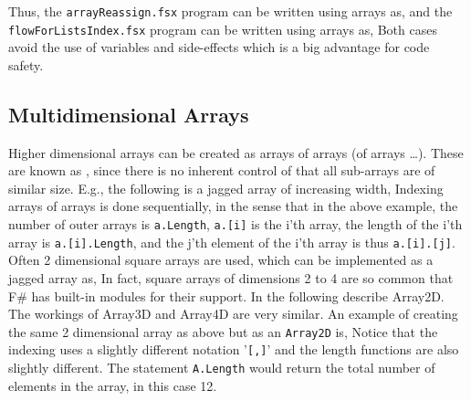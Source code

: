 Thus, the \texttt{arrayReassign.fsx} program can be written using arrays as,
and the \texttt{flowForListsIndex.fsx} program can be written using arrays as,
Both cases avoid the use of variables and side-effects which is a big advantage for code safety.

\subsection{Multidimensional Arrays}
Higher dimensional arrays can be created as arrays of arrays (of arrays \dots). These are known as , since there is no inherent control of that all sub-arrays are of similar size. E.g., the following is a jagged array of increasing width,
Indexing arrays of arrays is done sequentially, in the sense that in the above example, the number of outer arrays is \verb|a.Length|,  \verb|a.[i]| is the i'th array, the length of the i'th array is \verb|a.[i].Length|, and the j'th element of the i'th array is thus \verb|a.[i].[j]|. Often 2 dimensional square arrays are used, which can be implemented as a jagged array as,
In fact, square arrays of dimensions 2 to 4 are so common that F\# has built-in modules for their support. In the following describe Array2D. The workings of Array3D and Array4D are very similar. An example of creating the same 2 dimensional array as above but as an \texttt{Array2D} is,
Notice that the indexing uses a slightly different notation '\verb|[,]|' and the length functions are also slightly different. The statement \verb|A.Length| would return the total number of elements in the array, in this case 12.


